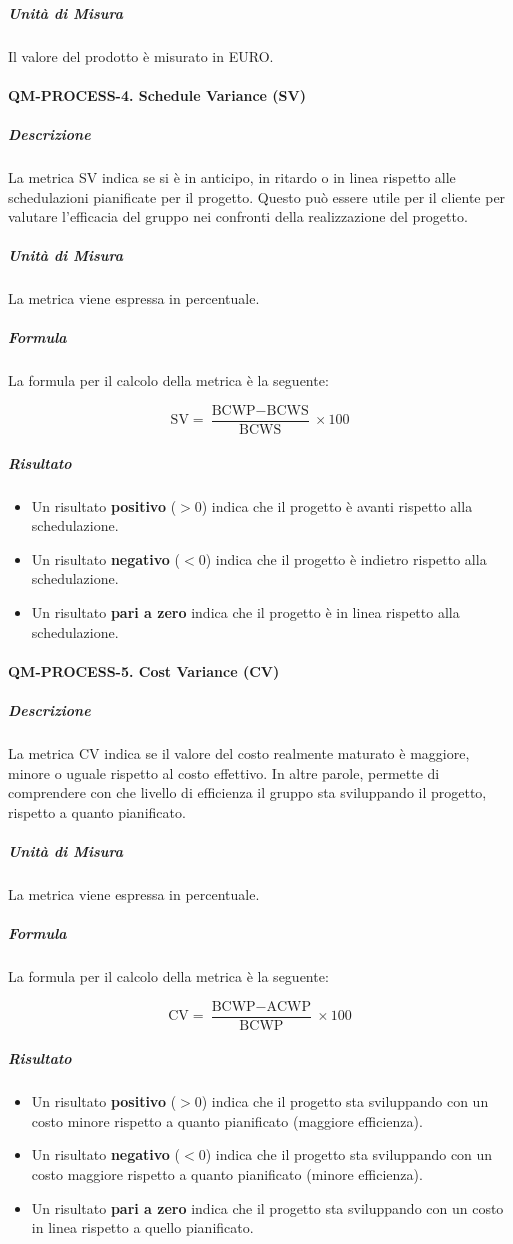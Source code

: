 			\subparagraph{Unità di Misura}
			Il valore del prodotto è misurato in EURO.

		\paragraph{QM-PROCESS-4. Schedule Variance (SV)}

			\subparagraph{Descrizione}
			La metrica SV indica se si è in anticipo, in ritardo o in linea rispetto alle schedulazioni pianificate per il progetto. Questo può essere utile per il cliente per valutare l'efficacia del gruppo nei confronti della realizzazione del progetto.

			\subparagraph{Unità di Misura}
			La metrica viene espressa in percentuale.

			\subparagraph{Formula}
			La formula per il calcolo della metrica è la seguente:

			\[
				\text{SV} = \frac{\text{BCWP} - \text{BCWS}}{\text{BCWS}} \times 100
			\]

			\subparagraph{Risultato}
			\begin{itemize}
				\item Un risultato \textbf{positivo} (\(> 0\)) indica che il progetto è avanti rispetto alla schedulazione.
				\item Un risultato \textbf{negativo} (\(< 0\)) indica che il progetto è indietro rispetto alla schedulazione.
				\item Un risultato \textbf{pari a zero} indica che il progetto è in linea rispetto alla schedulazione.
			\end{itemize}

		\paragraph{QM-PROCESS-5. Cost Variance (CV)}

			\subparagraph{Descrizione}
			La metrica CV indica se il valore del costo realmente maturato è maggiore, minore o uguale rispetto al costo effettivo. In altre parole, permette di comprendere con che livello di efficienza il gruppo sta sviluppando il progetto, rispetto a quanto pianificato.

			\subparagraph{Unità di Misura}
			La metrica viene espressa in percentuale.

			\subparagraph{Formula}
			La formula per il calcolo della metrica è la seguente:

			\[
				\text{CV} = \frac{\text{BCWP} - \text{ACWP}}{\text{BCWP}} \times 100
			\]

			\subparagraph{Risultato}
			\begin{itemize}
				\item Un risultato \textbf{positivo} (\(> 0\)) indica che il progetto sta sviluppando con un costo minore rispetto a quanto pianificato (maggiore efficienza).
				\item Un risultato \textbf{negativo} (\(< 0\)) indica che il progetto sta sviluppando con un costo maggiore rispetto a quanto pianificato (minore efficienza).
				\item Un risultato \textbf{pari a zero} indica che il progetto sta sviluppando con un costo in linea rispetto a quello pianificato.
			\end{itemize}